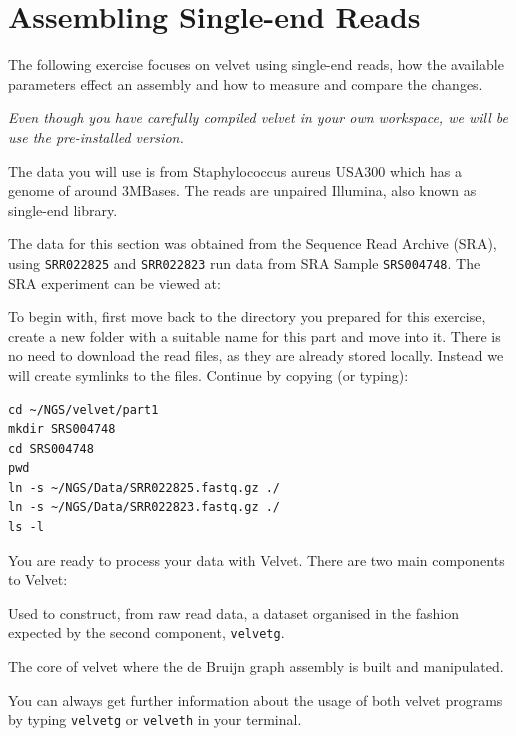 \section{Assembling Single-end Reads}

The following exercise focuses on velvet using single-end reads, how the
available parameters effect an assembly and how to measure and compare the
changes.

\emph{Even though you have carefully compiled velvet in your own
workspace, we will be use the pre-installed version.}

\begin{note}
The data you will use is from Staphylococcus aureus USA300 which has a
genome of around 3MBases. The reads are unpaired Illumina, also known as
single-end library.

The data for this section was obtained from the Sequence Read Archive (SRA),
using \texttt{SRR022825} and \texttt{SRR022823} run data from SRA Sample
\texttt{SRS004748}. The SRA experiment can be viewed at:


\end{note}

\begin{steps}
To begin with, first move back to the directory you prepared for this exercise,
create a new folder with a suitable name for this part and move into it. There
is no need to download the read files, as they are already stored locally.
Instead we will create symlinks to the files. Continue by copying (or typing):
\begin{lstlisting}
cd ~/NGS/velvet/part1
mkdir SRS004748
cd SRS004748
pwd
ln -s ~/NGS/Data/SRR022825.fastq.gz ./
ln -s ~/NGS/Data/SRR022823.fastq.gz ./
ls -l
\end{lstlisting}
\end{steps}

\begin{information}
You are ready to process your data with Velvet. There are two main components to
Velvet:
\begin{description}[style=multiline,labelindent=0cm,align=right,leftmargin=\descriptionlabelspace,rightmargin=1.5cm,font=\ttfamily]
  \item[velveth] Used to construct, from raw read data, a dataset organised in the
    fashion expected by the second component, \texttt{velvetg}.
  \item[velvetg] The core of velvet where the de Bruijn graph assembly is built and
    manipulated.
\end{description}

You can always get further information about the usage of both velvet programs
by typing \texttt{velvetg} or \texttt{velveth} in your terminal.
\end{information}

